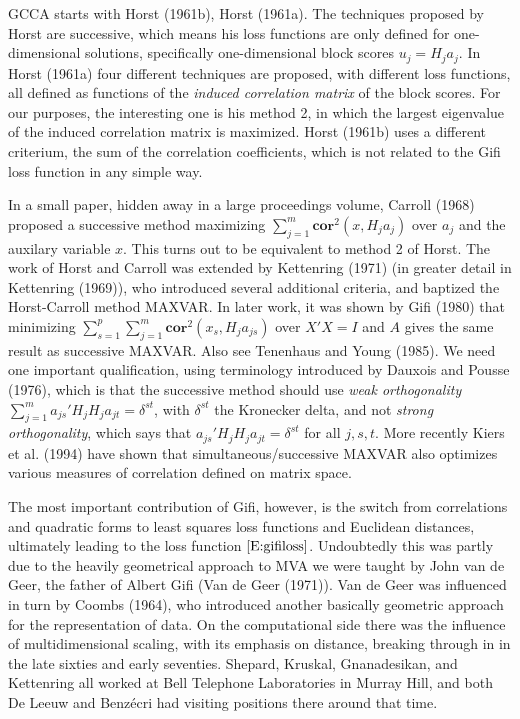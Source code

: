\documentclass[
  12pt,
  letterpaper,
  DIV=11,
  numbers=noendperiod]{scrreprt}
\begin{document}
GCCA starts with Horst (1961b), Horst (1961a). The techniques proposed
by Horst are successive, which means his loss functions are only defined
for one-dimensional solutions, specifically one-dimensional block scores
\(u_j=H_ja_j\). In Horst (1961a) four different techniques are proposed,
with different loss functions, all defined as functions of the
\emph{induced correlation matrix} of the block scores. For our purposes,
the interesting one is his method 2, in which the largest eigenvalue of
the induced correlation matrix is maximized. Horst (1961b) uses a
different criterium, the sum of the correlation coefficients, which is
not related to the Gifi loss function in any simple way.

In a small paper, hidden away in a large proceedings volume, Carroll
(1968) proposed a successive method maximizing
\(\sum_{j=1}^m\mathbf{cor}^2(x,H_ja_j)\) over \(a_j\) and the auxilary
variable \(x\). This turns out to be equivalent to method 2 of Horst.
The work of Horst and Carroll was extended by Kettenring (1971) (in
greater detail in Kettenring (1969)), who introduced several additional
criteria, and baptized the Horst-Carroll method MAXVAR. In later work,
it was shown by Gifi (1980) that minimizing
\(\sum_{s=1}^p\sum_{j=1}^m\mathbf{cor}^2(x_s,H_ja_{js})\) over \(X'X=I\)
and \(A\) gives the same result as successive MAXVAR. Also see Tenenhaus
and Young (1985). We need one important qualification, using terminology
introduced by Dauxois and Pousse (1976), which is that the successive
method should use \emph{weak orthogonality}
\(\sum_{j=1}^m a_{js}'H_jH_ja_{jt}=\delta^{st}\), with \(\delta^{st}\)
the Kronecker delta, and not \emph{strong orthogonality}, which says
that \(a_{js}'H_jH_ja_{jt}=\delta^{st}\) for all \(j,s,t\). More
recently Kiers et al. (1994) have shown that simultaneous/successive
MAXVAR also optimizes various measures of correlation defined on matrix
space.

The most important contribution of Gifi, however, is the switch from
correlations and quadratic forms to least squares loss functions and
Euclidean distances, ultimately leading to the loss function
\(\eqref{E:gifiloss}\). Undoubtedly this was partly due to the heavily
geometrical approach to MVA we were taught by John van de Geer, the
father of Albert Gifi (Van de Geer (1971)). Van de Geer was influenced
in turn by Coombs (1964), who introduced another basically geometric
approach for the representation of data. On the computational side there
was the influence of multidimensional scaling, with its emphasis on
distance, breaking through in in the late sixties and early seventies.
Shepard, Kruskal, Gnanadesikan, and Kettenring all worked at Bell
Telephone Laboratories in Murray Hill, and both De Leeuw and Benzécri
had visiting positions there around that time.
\end{document}
